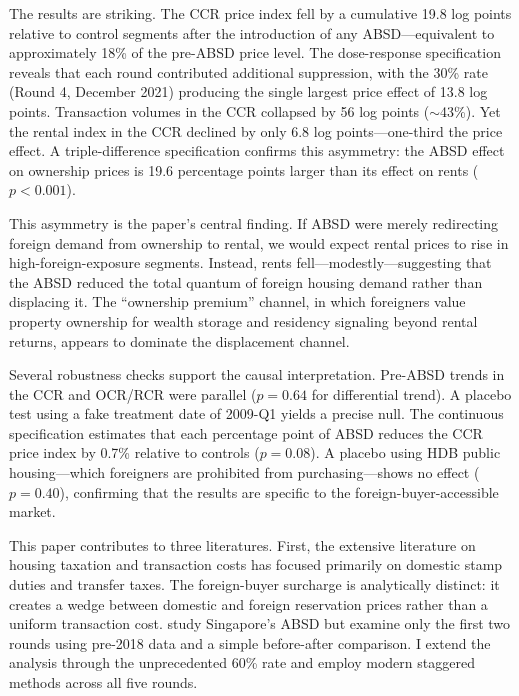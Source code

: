 \documentclass[12pt]{article}
\begin{document}
The results are striking. The CCR price index fell by a cumulative 19.8 log points relative to control segments after the introduction of any ABSD---equivalent to approximately 18\% of the pre-ABSD price level. The dose-response specification reveals that each round contributed additional suppression, with the 30\% rate (Round 4, December 2021) producing the single largest price effect of 13.8 log points. Transaction volumes in the CCR collapsed by 56 log points ($\sim$43\%). Yet the rental index in the CCR declined by only 6.8 log points---one-third the price effect. A triple-difference specification confirms this asymmetry: the ABSD effect on ownership prices is 19.6 percentage points larger than its effect on rents ($p < 0.001$).

This asymmetry is the paper's central finding. If ABSD were merely redirecting foreign demand from ownership to rental, we would expect rental prices to rise in high-foreign-exposure segments. Instead, rents fell---modestly---suggesting that the ABSD reduced the total quantum of foreign housing demand rather than displacing it. The ``ownership premium'' channel, in which foreigners value property ownership for wealth storage and residency signaling beyond rental returns, appears to dominate the displacement channel.

Several robustness checks support the causal interpretation. Pre-ABSD trends in the CCR and OCR/RCR were parallel ($p = 0.64$ for differential trend). A placebo test using a fake treatment date of 2009-Q1 yields a precise null. The continuous specification estimates that each percentage point of ABSD reduces the CCR price index by 0.7\% relative to controls ($p = 0.08$). A placebo using HDB public housing---which foreigners are prohibited from purchasing---shows no effect ($p = 0.40$), confirming that the results are specific to the foreign-buyer-accessible market.

This paper contributes to three literatures. First, the extensive literature on housing taxation and transaction costs \citep{Best2018, Hilber2016, Kopczuk2006} has focused primarily on domestic stamp duties and transfer taxes. The foreign-buyer surcharge is analytically distinct: it creates a wedge between domestic and foreign reservation prices rather than a uniform transaction cost. \citet{Deng2018} study Singapore's ABSD but examine only the first two rounds using pre-2018 data and a simple before-after comparison. I extend the analysis through the unprecedented 60\% rate and employ modern staggered methods across all five rounds.
\end{document}
